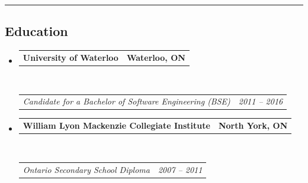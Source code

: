 \documentclass[10pt,letterpaper]{article}
\makeatletter
\newcommand{\headerrow}[2]
{\begin{tabular*}{\linewidth}{l@{\extracolsep{\fill}}r}
	#1 &
	#2 \\
\end{tabular*}}
\makeatother
\begin{document}
\hrule
\vspace{-0.4em}
\subsection*{Education}

\begin{itemize}
	\parskip=0.1em

	\item 
	\headerrow
		{\textbf{University of Waterloo}}
		{\textbf{Waterloo, ON}}
	\\
	\headerrow
		{\emph{Candidate for a Bachelor of Software Engineering (BSE)}}
		{\emph{2011 -- 2016}}
		
	\item 
	\headerrow
		{\textbf{William Lyon Mackenzie Collegiate Institute}}
		{\textbf{North York, ON}}
	\\
	\headerrow
		{\emph{Ontario Secondary School Diploma}}
		{\emph{2007 -- 2011}}

\end{itemize}
\end{document}
